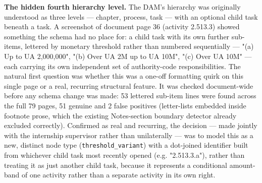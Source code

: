 \textbf{The hidden fourth hierarchy level.} The DAM's hierarchy was originally understood as three levels — chapter, process, task — with an optional child task beneath a task. A screenshot of document page 36 (activity 2.513.3) showed something the schema had no place for: a child task with its own further sub-items, lettered by monetary threshold rather than numbered sequentially — "(a) Up to UA 2,000,000", "(b) Over UA 2M up to UA 10M", "(c) Over UA 10M" — each carrying its own independent set of authority-code responsibilities. The natural first question was whether this was a one-off formatting quirk on this single page or a real, recurring structural feature. It was checked document-wide before any schema change was made: 53 lettered sub-item lines were found across the full 79 pages, 51 genuine and 2 false positives (letter-lists embedded inside footnote prose, which the existing Notes-section boundary detector already excluded correctly). Confirmed as real and recurring, the decision — made jointly with the internship supervisor rather than unilaterally — was to model this as a new, distinct node type (\texttt{threshold\_\allowbreak{}variant}) with a dot-joined identifier built from whichever child task most recently opened (e.g. "2.513.3.a"), rather than treating it as just another child task, because it represents a conditional amount-band of one activity rather than a separate activity in its own right.

